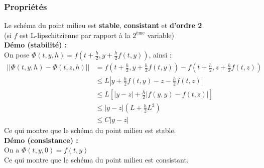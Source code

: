 \documentclass[a4paper,10pt]{report}
\begin{document}
\subsubsection{Propriétés}
Le schéma du point milieu est \textbf{stable}, \textbf{consistant} et \textbf{d'ordre 2}.\\
(si $f$ est L-lipschitzienne par rapport à la $2^{\text{ème}}$ variable)  \\

\newpage
\textbf{Démo (stabilité) :}\\
\indent On pose $\Phi(t,y,h)=f(t + \frac{h}{2}, y + \frac{h}{2}f(t,y))$, ainsi :
\begin{align*}
||\Phi(t,y,h)-\Phi(t,z,h)|| & = f(t+\frac{h}{2},y+\frac{h}{2}f(t,y)) - f(t+\frac{h}{2},z+\frac{h}{2}f(t,z))  \\
							& \leq L|y+\frac{h}{2}f(t,y)-z-\frac{h}{2}f(t,z)| \\
							& \leq L\left[ |y-z| + \frac{h}{2}|f(y,y)-f(t,z)| \right] \\
							& \leq |y-z|(L+\frac{h}{2}L^2) \\
							& \leq C|y-z|
\end{align*}
\indent Ce qui montre que le schéma du point milieu est stable. \\

\textbf{Démo (consistance) :}\\
\indent On a $\Phi(t,y,0)=f(t,y)$\\
\indent Ce qui montre que le schéma du point milieu est consistant.\\
\end{document}

